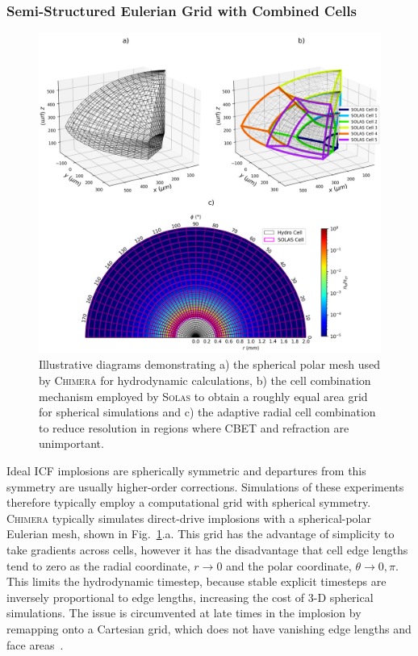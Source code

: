 \subsubsection{Semi-Structured Eulerian Grid with Combined Cells}

\begin{figure}[t!]
    \includegraphics[width=\linewidth]{Numerics/Images/solas_cells_3imagescombined.png}
    \centering
    \caption{Illustrative diagrams demonstrating a) the spherical polar mesh used by \textsc{Chimera} for hydrodynamic calculations, b) the cell combination mechanism employed by \textsc{Solas} to obtain a roughly equal area grid for spherical simulations and c) the adaptive radial cell combination to reduce resolution in regions where \ac{CBET} and refraction are unimportant.}%
    \label{fig:SOLAS_combined_cells}
\end{figure}

Ideal \ac{ICF} implosions are spherically symmetric and departures from this symmetry are usually higher-order corrections.
Simulations of these experiments therefore typically employ a computational grid with spherical symmetry.
\textsc{Chimera} typically simulates direct-drive implosions with a spherical-polar Eulerian mesh, shown in Fig.~\ref{fig:SOLAS_combined_cells}.a.
This grid has the advantage of simplicity to take gradients across cells, however it has the disadvantage that cell edge lengths tend to zero as the radial coordinate, $r\rightarrow 0$ and the polar coordinate, $\theta\rightarrow 0,\pi$.
This limits the hydrodynamic timestep, because stable explicit timesteps are inversely proportional to edge lengths, increasing the cost of 3-D spherical simulations.
The issue is circumvented at late times in the implosion by remapping onto a Cartesian grid, which does not have vanishing edge lengths and face areas~\cite{chittenden_signatures_2016}.

